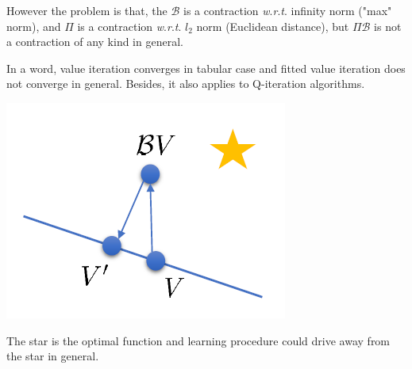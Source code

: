 \documentclass{tufte-handout}
\newcommand{\wrt}{\textit{w}.\textit{r}.\textit{t}. }
\begin{document}
However the problem is that, the $\mathcal{B}$ is a contraction \wrt infinity norm ("max" norm), and $\Pi$ is a contraction \wrt $l_2$ norm (Euclidean distance), but $\Pi \mathcal{B}$ is not a contraction of any kind in general.

In a word, value iteration converges in tabular case and fitted value iteration does not converge in general. Besides, it also applies to Q-iteration algorithms.

\begin{marginfigure}
\centering
\includegraphics[width=\linewidth]{no-converge}
\caption{The star is the optimal function and learning procedure could drive away from the star in general.}
\label{fig:no-converge}
\end{marginfigure}
\end{document}
